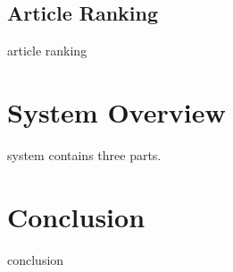 \documentclass[conference]{IEEEtran}
\begin{document}
\subsection{Article Ranking}
article ranking


\section{System Overview}
system contains\cite{ma2018query} three \cite{sinha2015overview} parts.

\section{Conclusion}
conclusion




%
%
%






\end{document}
